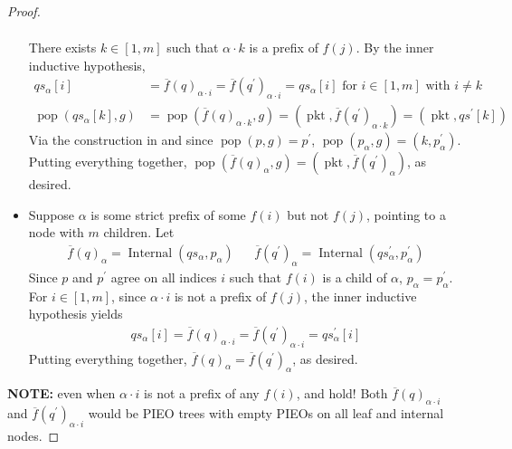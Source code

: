 \documentclass{amsart}
\makeatletter
\DeclareMathOperator{\pkt}{\mathrm{pkt}}
\DeclareMathOperator{\pop}{\mathrm{pop}}
\DeclareMathOperator{\Internal}{\mathrm{Internal}}
\theoremstyle{definition}
\newcommand{\leqnomode}{\tagsleft@true\let\veqno\@@leqno}
\makeatother
\begin{document}
\begin{proof}
\begin{itemize}
\begin{align*}
            \end{align*}
            There exists $k \in [1, m]$ such that $\alpha \cdot k$ is a prefix of $f(j)$.
            By the inner inductive hypothesis,
            \begin{align*}
                qs_\alpha[i] &= \overline{f}(q)_{\alpha \cdot i} = \overline{f}(q^\prime)_{\alpha \cdot i} = qs_\alpha[i] \text{ for $i \in [1,m]$ with $i \neq k$} \label{eq:empty1} \tag{!}\\
                \pop(qs_\alpha[k], g) &=  \pop(\overline{f}(q)_{\alpha \cdot k}, g) = (\pkt, \overline{f}(q^\prime)_{\alpha \cdot k}) = (\pkt, qs^\prime[k])
            \end{align*}
            Via the construction in  and since $\pop(p, g) = p^\prime$, $\pop(p_\alpha, g) = (k, p_\alpha^\prime)$.
            Putting everything together, $\pop(\overline{f}(q)_\alpha, g) = (\pkt, \overline{f}(q^\prime)_\alpha)$, as desired.

        \item Suppose $\alpha$ is some strict prefix of some $f(i)$ but not $f(j)$, pointing to a node with $m$ children.
            Let 
            \begin{align*}
                \overline{f}(q)_\alpha = \Internal(qs_\alpha, p_\alpha) &&
                \overline{f}(q^\prime)_\alpha = \Internal(qs^{\prime}_\alpha, p^{\prime}_\alpha)
            \end{align*}
            Since $p$ and $p^\prime$ agree on all indices $i$ such that $f(i)$ is a child of $\alpha$, $p_\alpha = p^\prime_\alpha$.
            For $i \in [1,m]$, since $\alpha \cdot i$ is not a prefix of $f(j)$, the inner inductive hypothesis yields
            \begin{align*}
                qs_\alpha[i] = \overline{f}(q)_{\alpha\cdot i} = \overline{f}(q^\prime)_{\alpha\cdot i} = qs^\prime_\alpha[i] \label{eq:empty2} \tag{!!}
            \end{align*}
            Putting everything together, $\overline{f}(q)_\alpha = \overline{f}(q^\prime)_\alpha$, as desired.
    \end{itemize}
    \textbf{NOTE:}
    even when $\alpha \cdot i$ is not a prefix of any $f(i)$,  and  hold!
    Both $\overline{f}(q)_{\alpha \cdot i}$ and $\overline{f}(q^\prime)_{\alpha \cdot i}$ would be PIEO trees with empty PIEOs on all leaf and internal nodes.
\end{proof}

\leqnomode
\end{document}
